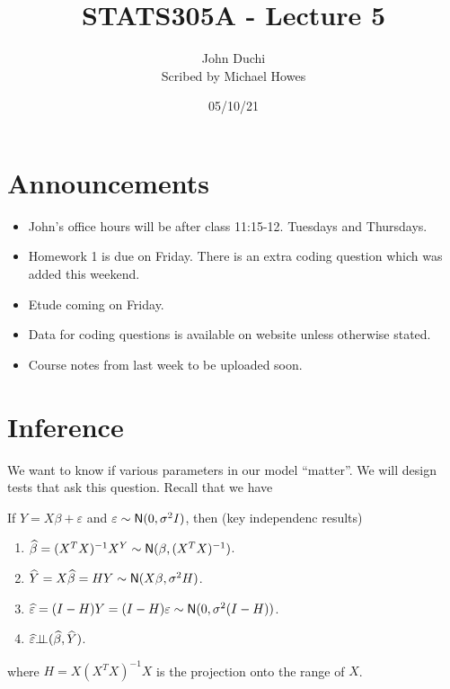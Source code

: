 




\title{STATS305A - Lecture 5}
\author{John Duchi\\ Scribed by Michael Howes}
\date{05/10/21}

\pagestyle{fancy}
\fancyhf{}


\maketitle
\tableofcontents
\section{Announcements}
\begin{itemize}
    \item John's office hours will be after class 11:15-12. Tuesdays and Thursdays.
    \item Homework 1 is due on Friday. There is an extra coding question which was added this weekend.
    \item Etude coming on Friday.
    \item Data for coding questions is available on website unless otherwise stated.
    \item Course notes from last week to be uploaded soon.
\end{itemize}
\section{Inference}
We want to know if various parameters in our model ``matter''. We will design tests that ask this question. Recall that we have
\begin{thrm}
    If $Y=X\beta + \varepsilon$ and $\varepsilon \sim {\mathsf{N}}(0, \sigma^2 I)$, then (key independenc results)
    \begin{enumerate}
        \item $\widehat{\beta} = (X^TX)^{-1}X^Y \sim {\mathsf{N}}(\beta, (X^TX)^{-1})$.
        \item $\widehat{Y}=X\widehat{\beta} = HY \sim {\mathsf{N}}(X\beta,\sigma^2 H)$.
        \item $\widehat{\varepsilon} = (I-H)Y = (I-H)\varepsilon \sim {\mathsf{N}}(0, \sigma^2(I-H))$.
        \item $\widehat{\varepsilon} {\perp\!\!\!\perp} (\widehat{\beta},\widehat{Y})$.
    \end{enumerate}
    where $H = X(X^TX)^{-1}X$ is the projection onto the range of $X$.
\end{thrm}
